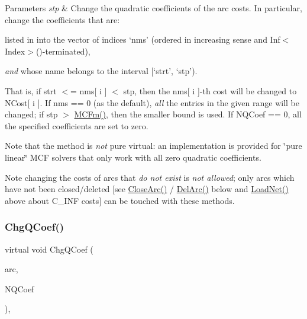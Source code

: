 \begin{DoxyParams}{Parameters}
{\em stp} & Change the quadratic coefficients of the arc costs. In particular, change the coefficients that are\+:\\
\hline
\end{DoxyParams}

\begin{DoxyItemize}
\item listed in into the vector of indices `nms' (ordered in increasing sense and Inf$<$\+Index$>$()-\/terminated),
\item {\itshape and} whose name belongs to the interval \mbox{[}`strt', `stp').
\end{DoxyItemize}

That is, if strt $<$= nms\mbox{[} i \mbox{]} $<$ stp, then the nms\mbox{[} i \mbox{]}-\/th cost will be changed to N\+Cost\mbox{[} i \mbox{]}. If nms == 0 (as the default), {\itshape all} the entries in the given range will be changed; if stp $>$ \mbox{\hyperlink{class_m_c_f_class_ab4d5a0d0fc49882de0b4eb3146f1b7a6}{M\+C\+Fm()}}, then the smaller bound is used. If N\+Q\+Coef == 0, all the specified coefficients are set to zero.

Note that the method is {\itshape not} pure virtual\+: an implementation is provided for \char`\"{}pure linear\char`\"{} M\+CF solvers that only work with all zero quadratic coefficients.

\begin{DoxyNote}{Note}
changing the costs of arcs that {\itshape do not exist} is {\itshape not allowed}; only arcs which have not been closed/deleted \mbox{[}see \mbox{\hyperlink{class_m_c_f_class_ae1c33ba491b57343fbc157123fff5b11}{Close\+Arc()}} / \mbox{\hyperlink{class_m_c_f_class_ae291d6625ff31a5fdcc1ef166e2dee34}{Del\+Arc()}} below and \mbox{\hyperlink{class_m_c_f_class_a8d82d26f7845eb69081c860e14c3dc4c}{Load\+Net()}} above about C\+\_\+\+I\+NF costs\mbox{]} can be touched with these methods. 
\end{DoxyNote}
\mbox{\label{class_m_c_f_class_a4df44e18d436b2500e5608d6ab2d58ad}} 
\subsubsection{\texorpdfstring{Chg\+Q\+Coef()}{ChgQCoef()}\hspace{0.1cm}{\footnotesize\ttfamily [2/2]}}
{\footnotesize\ttfamily virtual void Chg\+Q\+Coef (\begin{DoxyParamCaption}\item[{\mbox{\hyperlink{class_m_c_f_class_ad53d6229d7ec28555a9c9c2fd9abf773}{Index}}}]{arc,  }\item[{\mbox{\hyperlink{class_m_c_f_class_a07dbefeeb08c3f63073622411893eb76}{c\+C\+Number}}}]{N\+Q\+Coef }\end{DoxyParamCaption})\hspace{0.3cm}{\ttfamily [inline]}, {\ttfamily [virtual]}}


